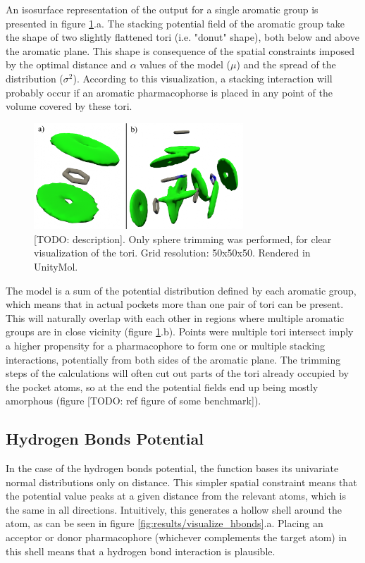       An isosurface representation of the output for a single aromatic group is presented in figure \ref{fig:results/visualize_stacking}.a. The stacking potential field of the aromatic group take the shape of two slightly flattened tori (i.e. "donut" shape), both below and above the aromatic plane. This shape is consequence of the spatial constraints imposed by the optimal distance and $\alpha$ values of the model ($\mu$) and the spread of the distribution ($\sigma^2$). According to this visualization, a stacking interaction will probably occur if an aromatic pharmacophorse is placed in any point of the volume covered by these tori.

      \begin{figure}[H]
        \centering
        \includegraphics[width=0.7\textwidth]{figures/results/visualize_stacking.png}
        \caption{\label{fig:results/visualize_stacking} [TODO: description]. Only sphere trimming was performed, for clear visualization of the tori. Grid resolution: 50x50x50. Rendered in UnityMol.}
      \end{figure}

      The model is a sum of the potential distribution defined by each aromatic group, which means that in actual pockets more than one pair of tori can be present. This will naturally overlap with each other in regions where multiple aromatic groups are in close vicinity (figure \ref{fig:results/visualize_stacking}.b). Points were multiple tori intersect imply a higher propensity for a pharmacophore to form one or multiple stacking interactions, potentially from both sides of the aromatic plane. The trimming steps of the calculations will often cut out parts of the tori already occupied by the pocket atoms, so at the end the potential fields end up being mostly amorphous (figure [TODO: ref figure of some benchmark]).

  \subsection{Hydrogen Bonds Potential}
    In the case of the hydrogen bonds potential, the function bases its univariate normal distributions only on distance. This simpler spatial constraint means that the potential value peaks at a given distance from the relevant atoms, which is the same in all directions. Intuitively, this generates a hollow shell around the atom, as can be seen in figure \ref{fig:results/visualize_hbonds}.a. Placing an acceptor or donor pharmacophore (whichever complements the target atom) in this shell means that a hydrogen bond interaction is plausible.

